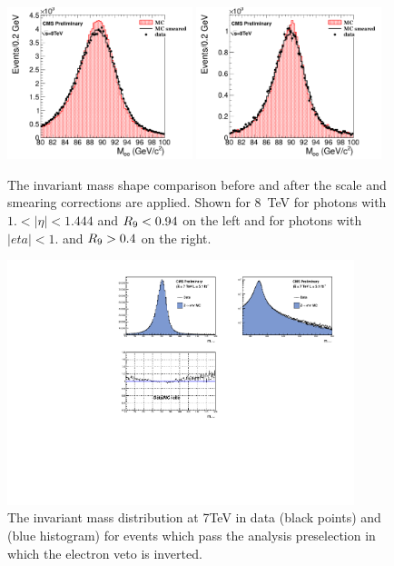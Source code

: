 \begin{figure}
  \includegraphics[width=0.48\textwidth]{ch3_comm_anal_comps/plots/smearing_EB_highEta_lowR9.pdf}
  \includegraphics[width=0.48\textwidth]{ch3_comm_anal_comps/plots/smearing_EB_lowEta_highR9.pdf}
  \caption{The \Zee invariant mass shape comparison before and after the scale and smearing corrections are applied. Shown for 8~TeV for photons with $1.<|\eta|<1.444$ and $R_{9}<0.94$ on the left and for photons with $|eta|<1.$ and $R_{9}>0.4$ on the right.}
  \label{fig:scale_smearing_Zee}
\end{figure}

\begin{figure}
  \includegraphics[width=0.9\textwidth]{ch3_comm_anal_comps/plots/smearing_mass_Zee_7TeV.pdf}
  \caption{The \Zee invariant mass distribution at 7TeV in data (black points) and \MC (blue histogram) for events which pass the analysis preselection in which the electron veto is inverted.}
  \label{fig:scale_smearing_analysis_7TeV}
\end{figure}

